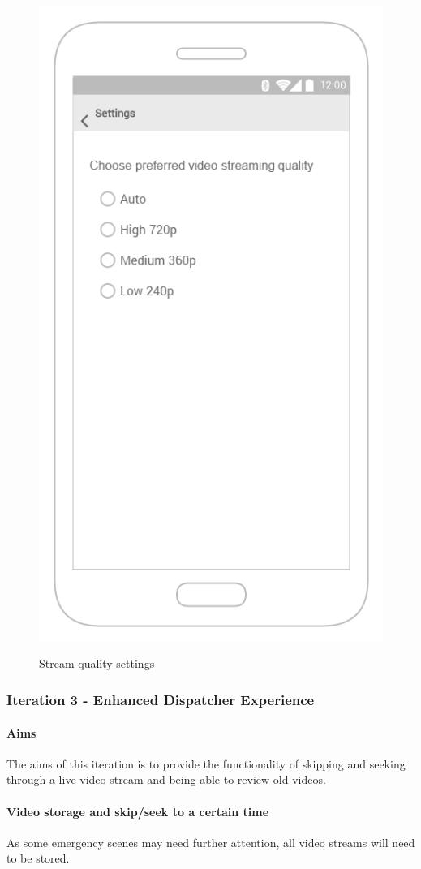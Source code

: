 \documentclass{article}
\begin{document}
	\begin{figure}[H]
		\centering
		\includegraphics[width=.6\textwidth]{"EmergencyAppIteration2/iteration2uisettings"}
		
		Stream quality settings
	\end{figure}


	\pagebreak
	\subsubsection{Iteration 3 - Enhanced Dispatcher Experience}
			\paragraph{Aims}
			The aims of this iteration is to provide the functionality of skipping and seeking through a live video stream and being able to review old videos.

\paragraph{Video storage and skip/seek to a certain time}
			As some emergency scenes may need further attention, all video streams will need to be stored. \\
\end{document}
